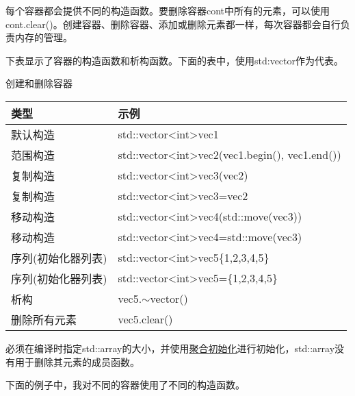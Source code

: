 每个容器都会提供不同的构造函数。要删除容器cont中所有的元素，可以使用cont.clear()。创建容器、删除容器、添加或删除元素都一样，每次容器都会自行负责内存的管理。

下表显示了容器的构造函数和析构函数。下面的表中，使用std:vector作为代表。

\begin{center}
创建和删除容器
\end{center}

\begin{longtable}[c]{|l|l|}
\hline
\textbf{类型}   & \textbf{示例}                                            \\ \hline
\endfirsthead
%
\endhead
%
默认构造         & std::vector\textless{}int\textgreater vec1                  \\ \hline
范围构造         & std::vector\textless{}int\textgreater vec2(vec1.begin(), vec1.end()) \\ \hline
复制构造            & std::vector\textless{}int\textgreater vec3(vec2)            \\ \hline
复制构造            & std::vector\textless{}int\textgreater vec3=vec2             \\ \hline
移动构造            & std::vector\textless{}int\textgreater vec4(std::move(vec3)) \\ \hline
移动构造            & std::vector\textless{}int\textgreater vec4=std::move(vec3)  \\ \hline
序列(初始化器列表) & std::vector\textless{}int\textgreater vec5\{1,2,3,4,5\}              \\ \hline
序列(初始化器列表) & std::vector\textless{}int\textgreater vec5=\{1,2,3,4,5\}             \\ \hline
析构      & vec5.$\sim$vector()                                         \\ \hline
删除所有元素 & vec5.clear()                                                \\ \hline
\end{longtable}

必须在编译时指定std::array的大小，并使用\href{https://en.cppreference.com/w/cpp/language/aggregate_initialization}{聚合初始化}进行初始化，std::array没有用于删除其元素的成员函数。

下面的例子中，我对不同的容器使用了不同的构造函数。

